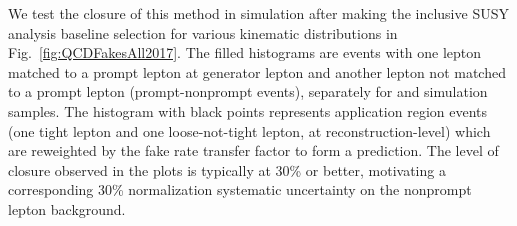 \FloatBarrier

We test the closure of this method in simulation after making the inclusive
SUSY analysis baseline selection for various kinematic distributions in
Fig.~\ref{fig:QCDFakesAll2017}. The filled histograms are events with one lepton
matched to a prompt lepton at generator lepton and another lepton not matched
to a prompt lepton (prompt-nonprompt events), separately for \ttjets and
\wjets simulation samples. The histogram with black points represents
application region events (one tight lepton and one loose-not-tight lepton,
at reconstruction-level) which are reweighted by the fake rate transfer
factor to form a prediction. The level of closure observed in the plots is
typically at 30\% or better, motivating a corresponding 30\% normalization
systematic uncertainty on the nonprompt lepton background.

